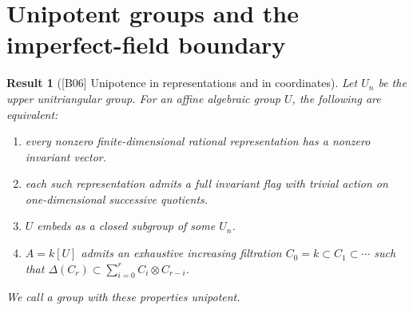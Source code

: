 \documentclass[11pt,a4paper,openany,oneside]{book}
\theoremstyle{resultstyle}
\newtheorem{statement}{Result}[chapter]
\newenvironment{result}[2]{\clubpenalty=10000\begin{statement}[\textnormal{[#1]} #2]\leavevmode\label{res:#1}\ignorespaces}{\end{statement}}
\theoremstyle{definition}
\numberwithin{equation}{chapter}
\begin{document}
\section{Unipotent groups and the imperfect-field boundary}

\begin{result}{B06}{Unipotence in representations and in coordinates}
Let \(U_n\) be the upper unitriangular group. For an affine algebraic
group \(U\), the following are equivalent:
\begin{enumerate}
\item every nonzero finite-dimensional rational representation has
a nonzero invariant vector.
\item each such representation admits a full invariant flag with
trivial action on one-dimensional successive quotients.
\item \(U\) embeds as a closed subgroup of some \(U_n\).
\item \(A=k[U]\) admits an exhaustive increasing filtration
\(C_0=k\subset C_1\subset\cdots\) such that
\(\Delta(C_r)\subset\sum_{i=0}^r C_i\otimes C_{r-i}\).
\end{enumerate}
We call a group with these properties \emph{unipotent}.
\end{result}
\end{document}
